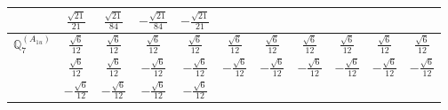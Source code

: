 \documentclass[fleqn,10pt,landscape]{article}
\begin{document}
\begin{itemize}
{\begin{center}
\begin{longtable}{ccccccccccc}
& $ \frac{\sqrt{21}}{21} $ & $ \frac{\sqrt{21}}{84} $ & $ - \frac{\sqrt{21}}{84} $ & $ - \frac{\sqrt{21}}{21} $ & $  $ & $  $ & $  $ & $  $ & $  $ & $  $ \\ \hline
$\mathbb{Q}_{7}^{(A_{1u})}$ & $ \frac{\sqrt{6}}{12} $ & $ \frac{\sqrt{6}}{12} $ & $ \frac{\sqrt{6}}{12} $ & $ \frac{\sqrt{6}}{12} $ & $ \frac{\sqrt{6}}{12} $ & $ \frac{\sqrt{6}}{12} $ & $ \frac{\sqrt{6}}{12} $ & $ \frac{\sqrt{6}}{12} $ & $ \frac{\sqrt{6}}{12} $ & $ \frac{\sqrt{6}}{12} $ \\
& $ \frac{\sqrt{6}}{12} $ & $ \frac{\sqrt{6}}{12} $ & $ - \frac{\sqrt{6}}{12} $ & $ - \frac{\sqrt{6}}{12} $ & $ - \frac{\sqrt{6}}{12} $ & $ - \frac{\sqrt{6}}{12} $ & $ - \frac{\sqrt{6}}{12} $ & $ - \frac{\sqrt{6}}{12} $ & $ - \frac{\sqrt{6}}{12} $ & $ - \frac{\sqrt{6}}{12} $ \\
& $ - \frac{\sqrt{6}}{12} $ & $ - \frac{\sqrt{6}}{12} $ & $ - \frac{\sqrt{6}}{12} $ & $ - \frac{\sqrt{6}}{12} $ & $  $ & $  $ & $  $ & $  $ & $  $ & $  $ \\
\end{longtable}
\end{center}
}
\end{itemize}
\end{document}

